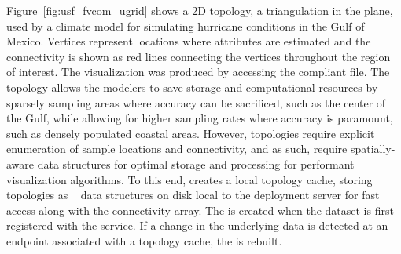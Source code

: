 Figure~\ref{fig:usf_fvcom_ugrid} shows a \ugrid{} 2D topology, a
triangulation in the plane, used by a climate model for simulating
hurricane conditions in the Gulf of Mexico. Vertices represent
locations where attributes are estimated and the connectivity is shown
as red lines connecting the vertices throughout the region of
interest. The visualization was produced by accessing the \cfugrid{}
compliant \ncml{} file. The \ugrid{} topology allows the modelers to
save storage and computational resources by sparsely sampling areas
where accuracy can be sacrificed, such as the center of the Gulf,
while allowing for higher sampling rates where accuracy is paramount,
such as densely populated coastal areas. However, \ugrid{} topologies
require explicit enumeration of sample locations and connectivity, and
as such, require spatially-aware data structures for optimal storage
and processing for performant visualization algorithms. To this end,
\sciwms{} creates a local topology cache, storing \ugrid{} topologies
as \rtree{}~\cite{Guttman84} data structures on disk local to the
deployment server for fast access along with the connectivity
array. The \rtree{} is created when the dataset is first registered
with the \sciwms{} service. If a change in the underlying data is
detected at an endpoint associated with a topology cache, the \rtree{}
is rebuilt.
